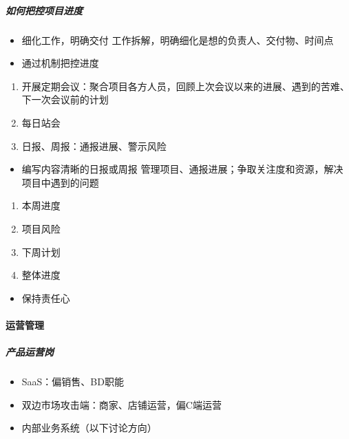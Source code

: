 \documentclass[letterpaper,11pt,english]{sphinxmanual}
\begin{document}
\subparagraph{如何把控项目进度}
\label{\detokenize{chapter_introduction/2B:id24}}\begin{itemize}
\item {} 
细化工作，明确交付 工作拆解，明确细化是想的负责人、交付物、时间点

\item {} 
通过机制把控进度

\end{itemize}
\begin{enumerate}
%
\item {} 
开展定期会议：聚合项目各方人员，回顾上次会议以来的进展、遇到的苦难、下一次会议前的计划

\item {} 
每日站会

\item {} 
日报、周报：通报进展、警示风险

\end{enumerate}
\begin{itemize}
\item {} 
编写内容清晰的日报或周报
管理项目、通报进展；争取关注度和资源，解决项目中遇到的问题

\end{itemize}
\begin{enumerate}
%
\item {} 
本周进度

\item {} 
项目风险

\item {} 
下周计划

\item {} 
整体进度

\end{enumerate}
\begin{itemize}
\item {} 
保持责任心

\end{itemize}


\paragraph{运营管理}
\label{\detokenize{chapter_introduction/2B:id25}}

\subparagraph{产品运营岗}
\label{\detokenize{chapter_introduction/2B:id26}}\begin{itemize}
\item {} 
SaaS：偏销售、BD职能

\item {} 
双边市场攻击端：商家、店铺运营，偏C端运营

\item {} 
内部业务系统（以下讨论方向）

\end{itemize}
\end{document}
